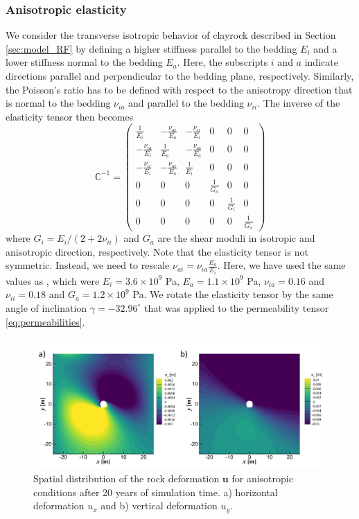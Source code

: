 \subsubsection*{Anisotropic elasticity}
We consider the transverse isotropic behavior of clayrock described in Section \ref{sec:model_RF} by defining a higher stiffness parallel to the bedding $E_i$ and a lower stiffness normal to the bedding $E_a$. Here, the subscripts $i$ and $a$ indicate directions parallel and perpendicular to the bedding plane, respectively. Similarly, the Poisson's ratio has to be defined with respect to the anisotropy  direction that is normal to the bedding $\nu_{ia}$ and parallel to the bedding $\nu_{ii}$.  The inverse of the elasticity tensor then becomes
\begin{equation}
\mathds{C}^{-1} =  	\begin{pmatrix}
 	\frac{1}{E_i} 		& -\frac{\nu_{ai}}{E_a}	& -\frac{\nu_{ii}}{E_i}	& 0	&0	&0 	\\
	-\frac{\nu_{ia}}{E_i}&\frac{1}{E_a}			& -\frac{\nu_{ia}}{E_a}	& 0	&0	&0 	\\
	-\frac{\nu_{ii}}{E_i}& -\frac{\nu_{ai}}{E_a}	&\frac{1}{E_i}		& 0	&0	&0 	\\
				0		& 0		& 0		& \frac{1}{G_a} &0				&0			\\		
				0		& 0		& 0		&0				&\frac{1}{G_i}	&0			\\	
				0		& 0		& 0		&0				&0		      	&\frac{1}{G_a} 	
				\end {pmatrix}
\end{equation}
where $G_i=E_i/(2+2\nu_{ii})$ and $G_a$ are the shear moduli in isotropic and anisotropic direction, respectively. Note that the elasticity tensor is not symmetric. Instead, we need to rescale $\nu_{ai}=\nu_{ia} \frac{E_a}{E_i}$. Here, we have used the same values as \cite{ziefle2018}, which were $E_{i}=3.6\times10^9$ Pa, $E_{a}=1.1\times10^9$ Pa, $\nu_{ia}=0.16$ and $\nu_{ii}=0.18$ and  $G_a=1.2\times10^9$ Pa. We rotate the elasticity tensor by the same angle of inclination $\gamma = -32.96^{\circ}$ that was applied to the permeability tensor \eqref{eq:permeabilities}. 

\begin{figure}[t]
\includegraphics[width=\textwidth, trim=0.5cm  0.0cm 0 0.0cm, clip]{./figures/MEX10_RM_OGS5_anisotropic.png}
\caption{Spatial distribution of the rock deformation $\textbf{u}$  for anisotropic conditions after 20 years of simulation time. a) horizontal deformation $u_x$ and b) vertical deformation $u_y$.}
\label{fig:RM_displacement_anisotropic}
\end{figure}

